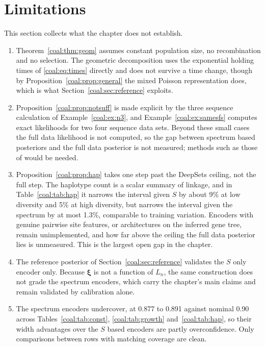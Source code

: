 \section{Limitations}\label{coal:sec:limits}

This section collects what the chapter does not establish.

\begin{enumerate}
\item Theorem~\ref{coal:thm:geom} assumes constant population size, no recombination and no selection. The geometric decomposition uses the exponential holding times of \eqref{coal:eq:times} directly and does not survive a time change, though by Proposition~\ref{coal:prop:general} the mixed Poisson representation does, which is what Section~\ref{coal:sec:reference} exploits.

\item Proposition~\ref{coal:prop:notsuff} is made explicit by the three sequence calculation of Example~\ref{coal:ex:n3}, and Example~\ref{coal:ex:samesfs} computes exact likelihoods for two four sequence data sets. Beyond these small cases the full data likelihood is not computed, so the gap between spectrum based posteriors and the full data posterior is not measured; methods such as those of \citet{coal:griffiths1994} would be needed.

\item Proposition~\ref{coal:prop:hap} takes one step past the DeepSets ceiling, not the full step. The haplotype count is a scalar summary of linkage, and in Table~\ref{coal:tab:hap} it narrows the interval given $S$ by about 9\% at low diversity and 5\% at high diversity, but narrows the interval given the spectrum by at most 1.3\%, comparable to training variation. Encoders with genuine pairwise site features, or architectures on the inferred gene tree, remain unimplemented, and how far above the ceiling the full data posterior lies is unmeasured. This is the largest open gap in the chapter.

\item The reference posterior of Section~\ref{coal:sec:reference} validates the $S$ only encoder only. Because $\bm{\xi}$ is not a function of $L_n$, the same construction does not grade the spectrum encoders, which carry the chapter's main claims and remain validated by calibration alone.

\item The spectrum encoders undercover, at 0.877 to 0.891 against nominal 0.90 across Tables~\ref{coal:tab:const}, \ref{coal:tab:growth} and~\ref{coal:tab:hap}, so their width advantages over the $S$ based encoders are partly overconfidence. Only comparisons between rows with matching coverage are clean.


\end{enumerate}
